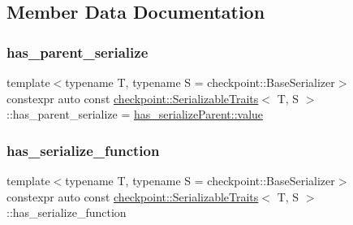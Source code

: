 \subsection{Member Data Documentation}
\mbox{\label{structcheckpoint_1_1_serializable_traits_a122e712dd9adffac78f239a7c30b0a8f}} 
\subsubsection{\texorpdfstring{has\+\_\+parent\+\_\+serialize}{has\_parent\_serialize}}
{\footnotesize\ttfamily template$<$typename T, typename S = checkpoint\+::\+Base\+Serializer$>$ \\
constexpr auto const \hyperlink{structcheckpoint_1_1_serializable_traits}{checkpoint\+::\+Serializable\+Traits}$<$ T, S $>$\+::has\+\_\+parent\+\_\+serialize = \hyperlink{structdetection_1_1detector_a6d7d0e1bdf5903db9edbe448edccf83b}{has\+\_\+serialize\+Parent\+::value}\hspace{0.3cm}{\ttfamily [static]}}

\mbox{\label{structcheckpoint_1_1_serializable_traits_a4d17a7627a8e033cccb5cf4e6b8fd0dc}} 
\subsubsection{\texorpdfstring{has\+\_\+serialize\+\_\+function}{has\_serialize\_function}}
{\footnotesize\ttfamily template$<$typename T, typename S = checkpoint\+::\+Base\+Serializer$>$ \\
constexpr auto const \hyperlink{structcheckpoint_1_1_serializable_traits}{checkpoint\+::\+Serializable\+Traits}$<$ T, S $>$\+::has\+\_\+serialize\+\_\+function\hspace{0.3cm}{\ttfamily [static]}}

